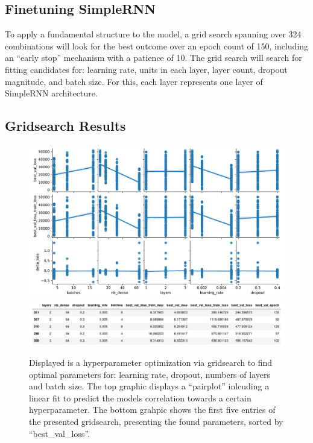 \subsection{Finetuning SimpleRNN}
To apply a fundamental structure to the model, a grid search spanning over 324 combinations will look for the best outcome over an epoch count of 150, including an \enquote{early stop} mechanism with a patience of 10.
The grid search will search for fitting candidates for: learning rate, units in each layer, layer count, dropout magnitude, and batch size. For this, each layer represents one layer of SimpleRNN architecture.

\subsection{Gridsearch Results}
\begin{figure}[H]
    \centering
    \includegraphics[width = \textwidth]{images/grid_search1.pdf}
    \includegraphics[width = \textwidth]{images/head.png}
    \caption{Displayed is a hyperparameter optimization via gridsearch to find optimal parameters for: learning rate, dropout, numbers of layers and batch size.
            The top graphic displays a \enquote{pairplot} \cite{sns} inlcuding a linear fit to predict the models correlation towards a certain hyperparameter.
            The bottom grahpic shows the first five entries of the presented gridsearch, presenting the found parameters, sorted by \enquote{best\_val\_loss}.}
    \label{fig:grid}
\end{figure}

